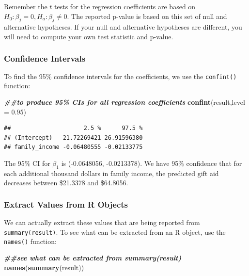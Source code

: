 \documentclass[
]{book}
\newenvironment{Shaded}{\begin{snugshade}}{\end{snugshade}}
\newcommand{\AttributeTok}[1]{\textcolor[rgb]{0.13,0.29,0.53}{#1}}
\newcommand{\DocumentationTok}[1]{\textcolor[rgb]{0.56,0.35,0.01}{\textbf{\textit{#1}}}}
\newcommand{\FloatTok}[1]{\textcolor[rgb]{0.00,0.00,0.81}{#1}}
\newcommand{\FunctionTok}[1]{\textcolor[rgb]{0.13,0.29,0.53}{\textbf{#1}}}
\newcommand{\NormalTok}[1]{#1}
\begin{document}
Remember the \(t\) tests for the regression coefficients are based on \(H_0: \beta_j = 0, H_a: \beta_j \neq 0\). The reported p-value is based on this set of null and alternative hypotheses. If your null and alternative hypotheses are different, you will need to compute your own test statistic and p-value.

\hypertarget{confidence-intervals-1}{%
\subsubsection*{Confidence Intervals}\label{confidence-intervals-1}}

To find the 95\% confidence intervals for the coefficients, we use the \texttt{confint()} function:

\begin{Shaded}
\begin{Highlighting}[]
\DocumentationTok{\#\#to produce 95\% CIs for all regression coefficients}
\FunctionTok{confint}\NormalTok{(result,}\AttributeTok{level =} \FloatTok{0.95}\NormalTok{)}
\end{Highlighting}
\end{Shaded}

\begin{verbatim}
##                     2.5 %      97.5 %
## (Intercept)   21.72269421 26.91596380
## family_income -0.06480555 -0.02133775
\end{verbatim}

The 95\% CI for \(\beta_1\) is (-0.0648056, -0.0213378). We have 95\% confidence that for each additional thousand dollars in family income, the predicted gift aid decreases between \$21.3378 and \$64.8056.

\hypertarget{extract-values-from-r-objects}{%
\subsubsection*{Extract Values from R Objects}\label{extract-values-from-r-objects}}

We can actually extract these values that are being reported from \texttt{summary(result)}. To see what can be extracted from an R object, use the \texttt{names()} function:

\begin{Shaded}
\begin{Highlighting}[]
\DocumentationTok{\#\#see what can be extracted from summary(result)}
\FunctionTok{names}\NormalTok{(}\FunctionTok{summary}\NormalTok{(result))}
\end{Highlighting}
\end{Shaded}
\end{document}
